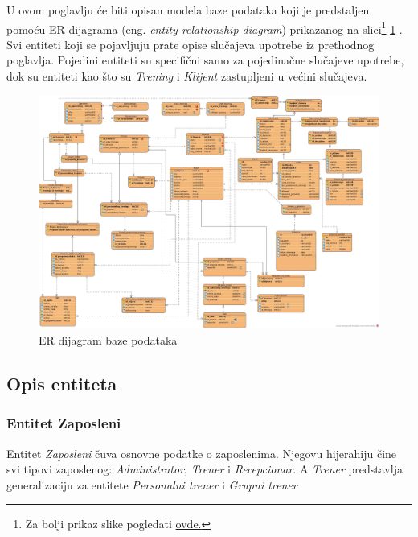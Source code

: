 \documentclass[../main.tex]{subfiles}
\begin{document}
U ovom poglavlju će biti opisan modela baze podataka koji je predstaljen pomoću ER dijagrama (eng. \textit{entity-relationship diagram}) prikazanog na slici\footnote{Za bolji prikaz slike pogledati \href{https://github.com/jovanape/Informacioni-sistem-za-teretane/blob/main/Dijagrami/jpg_fajlovi/EER\%20dijagram\%20baze\%20podataka\%20-\%20novo\%202.jpg}{ovde.} } \ref{fig:baza} . Svi entiteti koji se pojavljuju prate opise slučajeva upotrebe iz prethodnog poglavlja. Pojedini entiteti su specifični samo za pojedinačne slučajeve upotrebe, dok su entiteti kao što su \textit{Trening} i \textit{Klijent} zastupljeni u većini slučajeva. 


\begin{figure}[!ht]
\begin{center}
\includegraphics[scale=0.20]{sections/images/EER dijagram baze podataka - novo 2.jpg}
\end{center}
\caption{ER dijagram baze podataka}
\label{fig:baza}
\end{figure}

\subsection{Opis entiteta}


\subsubsection{Entitet Zaposleni}

Entitet \textit{Zaposleni} čuva osnovne podatke o zaposlenima. Njegovu hijerahiju čine svi tipovi zaposlenog: \textit{Administrator}, \textit{Trener} i \textit{Recepcionar}. A \textit{Trener} predstavlja generalizaciju za entitete \textit{Personalni trener} i \textit{Grupni trener}
\end{document}
